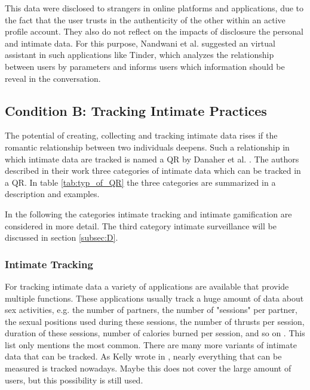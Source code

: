 This data were disclosed to strangers in online platforms and applications, due to the fact that the user trusts in the authenticity of the other within an active profile account. They also do not reflect on the impacts of disclosure the personal and intimate data. For this purpose, Nandwani et al. \cite{10.1007/978-3-319-61542-4_32} suggested an virtual assistant in such applications like Tinder, which analyzes the relationship between users by parameters and informs users which information should be reveal in the conversation.



\subsection{Condition B: Tracking Intimate Practices}
\label{subsec:B}
The potential of creating, collecting and tracking intimate data rises if the romantic relationship between two individuals deepens. Such a relationship in which intimate data are tracked is named a \ac{QR} by Danaher et al. \cite{doi:10.1080/15265161.2017.1409823}.
The authors described in their work three categories of intimate data which can be tracked in a \acs{QR}. In table \ref{tab:typ_of_QR} the three categories are summarized in a description and examples.

In the following the categories intimate tracking and intimate gamification are considered in more detail.
The third category intimate surveillance will be discussed in section \ref{subsec:D}.

\subsubsection{Intimate Tracking}
For tracking intimate data a variety of applications are available that provide multiple functions. These applications usually track a huge amount of data about sex activities, e.g. the number of partners, the number of "sessions" per partner, the sexual positions used during these sessions, the number of thrusts per session, duration of these sessions, number of calories burned per session, and so on \cite{doi:10.1080/15265161.2017.1409823}. 
This list only mentions the most common. There are many more variants of intimate data that can be tracked. As Kelly wrote in \cite{kelly2017inevitable}, nearly everything that can be measured is tracked nowadays. Maybe this does not cover the large amount of users, but this possibility is still used.

